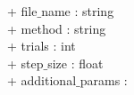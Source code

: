 {
+ file$\_$name : string \\
+ method : string \\
+ trials : int\\
+ step$\_$size : float\\
+ additional$\_$params :%
}
{
}
